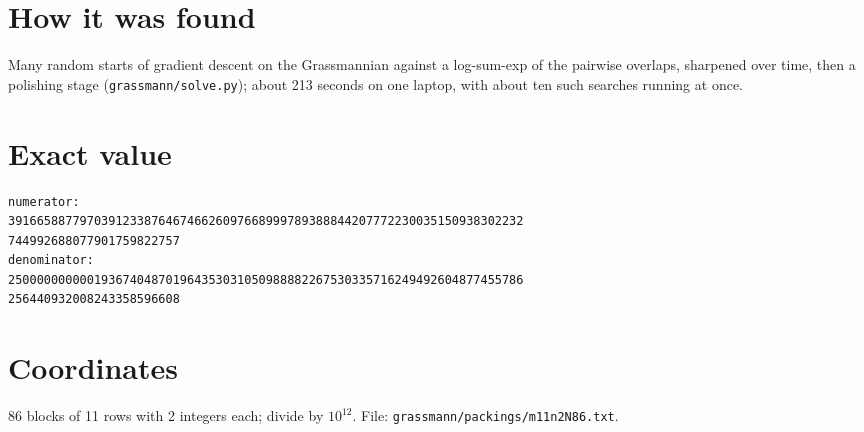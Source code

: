\documentclass[11pt,a4paper]{article}
\begin{document}
\section{How it was found}
Many random starts of gradient descent on the Grassmannian against a log-sum-exp of the pairwise overlaps, sharpened over time, then a polishing stage (\texttt{grassmann/solve.py}); about 213 seconds on one laptop, with about ten such searches running at once.


\appendix
\section{Exact value}
{\small
\begin{verbatim}
numerator:
391665887797039123387646746626097668999789388844207772230035150938302232
744992688077901759822757
denominator:
250000000000193674048701964353031050988882267530335716249492604877455786
256440932008243358596608
\end{verbatim}}

\section{Coordinates}
86 blocks of 11 rows with 2 integers each; divide by $10^{12}$. File: \texttt{grassmann/packings/m11n2N86.txt}.
{\tiny
\begin{multicols}{4}
\end{multicols}}
\end{document}

